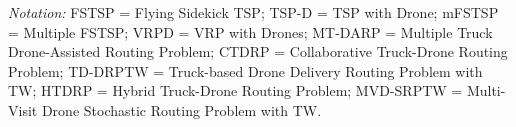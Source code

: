 \begin{table}[t]
\vspace{4pt}
\footnotesize
\textit{Notation:} FSTSP = Flying Sidekick TSP; TSP-D = TSP with Drone;
mFSTSP = Multiple FSTSP; VRPD = VRP with Drones;
MT-DARP = Multiple Truck Drone-Assisted Routing Problem;
CTDRP = Collaborative Truck-Drone Routing Problem;
TD-DRPTW = Truck-based Drone Delivery Routing Problem with TW;
HTDRP = Hybrid Truck-Drone Routing Problem;
MVD-SRPTW = Multi-Visit Drone Stochastic Routing Problem with TW.
\end{table}
